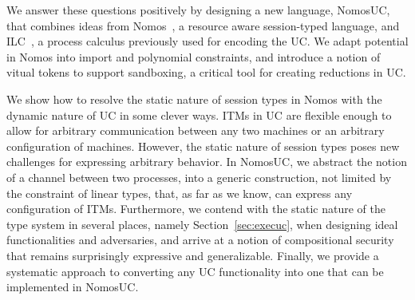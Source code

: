 We answer these questions positively by designing a new language, NomosUC, that combines ideas from
Nomos~\cite{dasnomos}, a resource aware session-typed language, and ILC~\cite{ilc},
a process calculus previously used for encoding the UC.
We adapt potential in Nomos into import and polynomial constraints, and introduce a notion of vitual tokens to support 
sandboxing, a critical tool for creating reductions in UC.

We show how to resolve the static nature of session types in Nomos with the dynamic nature of UC in some clever ways. 
ITMs in UC are flexible enough to allow for arbitrary communication between any two machines or an arbitrary configuration of machines.
However, the static nature of session types poses new challenges for expressing arbitrary behavior.
In NomosUC, we abstract the notion of a channel between two processes, into a generic construction, not limited by the constraint
of linear types, that, as far as we know, can express any configuration of ITMs.
Furthermore, we contend with the static nature of the type system in several places, namely Section~\ref{sec:execuc}, when designing ideal functionalities and adversaries,
and arrive at a notion of compositional security that remains surprisingly expressive and generalizable.
Finally, we provide a systematic approach to converting any UC functionality into one that can be implemented in NomosUC.

